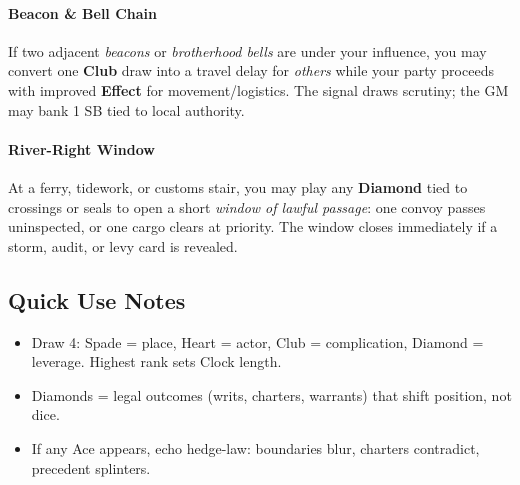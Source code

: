 \paragraph{Beacon \& Bell Chain}
If two adjacent \emph{beacons} or \emph{brotherhood bells} are under your influence, you may convert one \textbf{Club} draw into a travel delay for \emph{others} while your party proceeds with improved \textbf{Effect} for movement/logistics. The signal draws scrutiny; the GM may bank 1 SB tied to local authority.

\paragraph{River-Right Window}
At a ferry, tidework, or customs stair, you may play any \textbf{Diamond} tied to crossings or seals to open a short \emph{window of lawful passage}: one convoy passes uninspected, or one cargo clears at priority. The window closes immediately if a storm, audit, or levy card is revealed.

\subsection*{Quick Use Notes}
\label{sec:viterra-quick-use}
\begin{itemize}
\item Draw 4: Spade = place, Heart = actor, Club = complication, Diamond = leverage. Highest rank sets Clock length.
\item Diamonds = legal outcomes (writs, charters, warrants) that shift position, not dice.
\item If any Ace appears, echo hedge-law: boundaries blur, charters contradict, precedent splinters.
\end{itemize}

